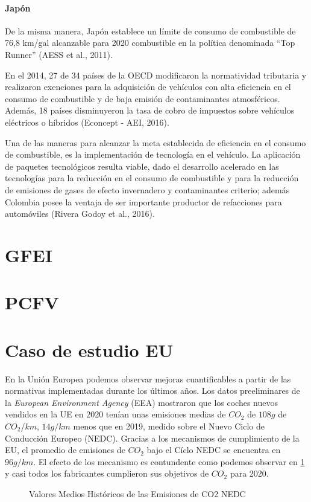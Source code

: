 \paragraph{Japón}
De la misma manera, Japón establece un límite de consumo de combustible de 76,8 km/gal alcanzable para 2020 combustible en la política denominada “Top Runner” (AESS et al., 2011). \\ \label{Informe Final}

En el 2014, 27 de 34 países de la OECD modificaron la normatividad tributaria y realizaron exenciones para la adquisición de vehículos con alta eficiencia en el consumo de combustible y de baja emisión de contaminantes atmosféricos. Además, 18 países disminuyeron la tasa de cobro de impuestos sobre vehículos eléctricos o híbridos (Econcept - AEI, 2016). \label{Informe Final}

Una de las maneras para alcanzar la meta establecida de eficiencia en el consumo de combustible, es la implementación de tecnología en el vehículo. La aplicación de paquetes tecnológicos resulta viable, dado el desarrollo acelerado en las tecnologías para la reducción en el consumo de combustible y para la reducción de emisiones de gases de efecto invernadero y contaminantes criterio; además Colombia posee la ventaja de ser importante productor de refacciones para automóviles (Rivera Godoy et al., 2016). 

\section{GFEI}

\section{PCFV}

\section{Caso de estudio EU}

En la Unión Europea podemos observar mejoras cuantificables a partir de las normativas implementadas durante los últimos años. Los datos preeliminares de la \textit{European Environment Agency} (EEA) mostraron que los coches nuevos vendidos en la UE en 2020 tenían unas emisiones medias de $CO_2$ de $108g$ de $CO_2/km$, $14g/km$ menos que en 2019, medido sobre el Nuevo Ciclo de Conducción Europeo (NEDC). \cite{ICCT_Performance_2020} Gracias a los mecanismos de cumplimiento de la EU, el promedio de emisiones de $CO_2$ bajo el Cíclo NEDC se encuentra en $96 g/km$. El efecto de los mecanismo es contundente como podemos observar en \ref{fig:iccp-performance} y casi todos los fabricantes cumplieron sus objetivos de $CO_2$ para 2020.

 \begin{figure}[htbp]
   \centering
   
    \caption{Valores Medios Históricos de las Emisiones de CO2 NEDC \cite{ICCT_Performance_2020}}
    \label{fig:iccp-performance}
\end{figure}